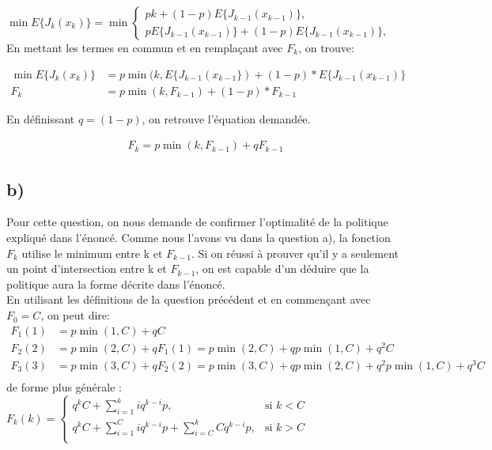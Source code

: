 \documentclass[oneside]{book}
\begin{document}
\begin{math}
\min E \{ J_k(x_k) \} = 
\min\begin{cases}
pk + (1-p)E\{J_{k-1}(x_{k-1})\}, \\
pE\{J_{k-1}(x_{k-1})\} + (1-p)E\{J_{k-1}(x_{k-1})\},
\end{cases}
\end{math}
\\

En mettant les termes en commun et en remplaçant avec $F_k$, on trouve:

\begin{align*}
\min E \{ J_k(x_k) \} &= p\min(k,E \{J_{k-1}(x_{k-1}\}) + (1-p)*E \{J_{k-1}(x_{k-1})\} \\
F_k &= p\min(k, F_{k-1}) + (1-p)*F_{k-1}
\end{align*}

En définissant $q = (1-p)$, on retrouve l'équation demandée.

\begin{align*}
F_k = p\min(k, F_{k-1}) + qF_{k-1}
\end{align*}



\subsection*{b)}
Pour cette question, on nous demande de confirmer l'optimalité de la politique expliqué dans l'énoncé. Comme nous l'avons vu dans la question a), la fonction $F_k$ utilise le minimum entre k et $F_{k-1}$. Si on réussi à prouver qu'il y a seulement un point d'intersection entre k et $F_{k-1}$, on est capable d'un déduire que la politique aura la forme décrite dans l'énoncé. \\

En utilisant les définitions de la question précédent et en commençant avec $F_0 = C$, on peut dire:\\

\begin{align*}
F_1(1) &= p\min(1, C) + qC\\
F_2(2) &= p\min(2, C) + qF_1(1) = p\min(2,C) + qp\min(1,C) + q^2C\\
F_3(3) &= p\min(3, C) + qF_2(2) = p\min(3,C) + qp\min(2,C) + q^2p\min(1,C) + q^3C\\
\end{align*}
de forme plus générale :\\


\begin{math}
F_k(k) =  
\begin{cases}
q^kC + \sum\limits_{i=1}^{k}iq^{k-i}p, & \text{si } k < C\\
q^kC + \sum\limits_{i=1}^{C}iq^{k-i}p + \sum\limits_{i=C}^{k}Cq^{k-i}p, & \text{si }k > C\\
\end{cases}
\end{math}\\
\end{document}

